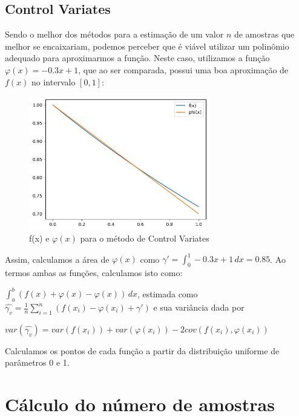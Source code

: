 \documentclass[a4paper]{article}
\begin{document}
\subsection{Control Variates}

Sendo o melhor dos métodos para a estimação de um valor $n$ de amostras que melhor se encaixariam, podemos perceber que é viável utilizar um polinômio adequado para aproximarmos a função. Neste caso, utilizamos a função $\varphi(x) = -0.3x + 1$, que ao ser comparada, possui uma boa aproximação de $f(x)$ no intervalo $[0,1]$:

\begin{figure}[H]
  \centering
  \includegraphics[width=0.7\textwidth]{Control.png}
  \caption{f(x) e $\varphi(x)$ para o método de Control Variates}
  \label{fig:Control}
\end{figure}

Assim, calculamos a área de $\varphi(x)$ como $\gamma' = \int_{0}^{1} -0.3x+1\,dx = 0.85$.
Ao termos ambas as funções, calculamos isto como:

\begin{center}

$\int_{a}^{b} (f(x) + \varphi(x) - \varphi(x)) \, dx$, estimada como $\hat{\gamma_v} = \frac{1}{n}\sum_{i = 1}^{n} (f(x_i) - \varphi(x_i) + \gamma')$ e sua variância dada por

\vspace{0.5cm}

$var(\hat{\gamma_v}) = var(f(x_i)) + var(\varphi(x_i)) - 2cov(f(x_i), \varphi(x_i))$

\end{center}

Calculamos os pontos de cada função a partir da distribuição uniforme de parâmetros 0 e 1.

\section{Cálculo do número de amostras}
\end{document}
